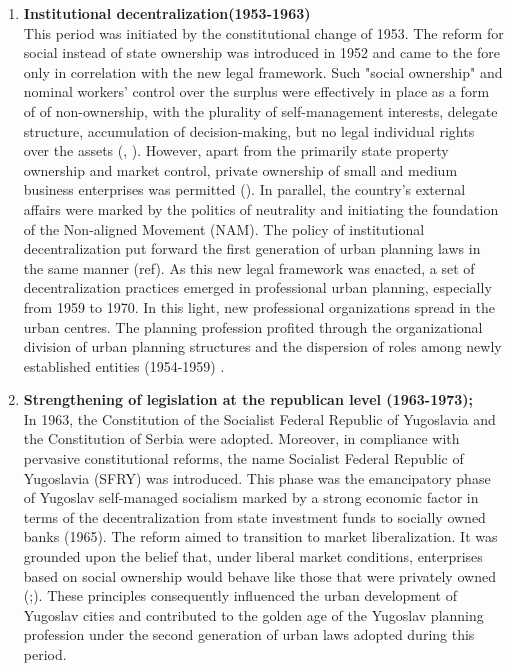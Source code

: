 \documentclass[11pt]{report}
\begin{document}
\begin{enumerate}
\item  \textbf{Institutional decentralization(1953-1963)}
\\
This period was initiated by the constitutional change of 1953. The reform for social instead of state ownership was introduced in 1952 and came to the fore only in correlation with the new legal framework. Such "social ownership" and nominal workers’ control over the surplus were effectively in place as a form of  of non-ownership, with the plurality of self-management interests, delegate structure, accumulation of decision-making, but no legal individual rights over the assets (\href{Estrin}{\citealt{estrin_yugoslavia:_1991}}, \href{Zec}{\citealt{zec_economic_2012}}).
However, apart from the primarily state property ownership and market control, private ownership of small and medium business enterprises was permitted (\href{Hadzic}{\citealt{hadzic_yugoslav_2002}}).
In parallel, the country’s external affairs were marked by the politics of neutrality and initiating the foundation of the Non-aligned Movement (NAM). The policy of institutional decentralization put forward the first generation of urban planning laws in the same manner (ref). As this new legal framework was enacted, a set of decentralization practices emerged in professional urban planning, especially from 1959 to 1970. In this light, new professional organizations spread in the urban centres. The planning profession profited through the organizational division of urban planning structures and the dispersion of roles among newly established entities (1954-1959) \href{Nedovic}{\citealt{nedovic-budic_mornings_2011}}. 

\item  \textbf{Strengthening of legislation at the republican level  (1963-1973);}
\\
In 1963, the Constitution of the Socialist Federal Republic of Yugoslavia and the Constitution of Serbia were adopted. Moreover, in compliance with pervasive constitutional reforms, the name Socialist Federal Republic of Yugoslavia (SFRY) was introduced. This phase was the emancipatory phase of Yugoslav self-managed socialism marked by a strong economic factor in terms of the decentralization from state investment funds to socially owned banks (1965). The reform aimed to transition to market liberalization. It was grounded upon the belief that, under liberal market conditions, enterprises based on social ownership would behave like those that were privately owned  (\href{Estrin}{\citealt{estrin_self_1983}};\href{Zec}{\citealt{zec_economic_2012}}).
These principles consequently influenced the urban development of Yugoslav cities and contributed to the golden age of the Yugoslav planning profession under the second generation of urban laws adopted during this period.
\\


\end{enumerate}
\end{document}
